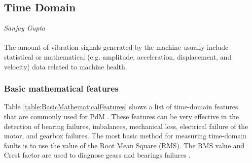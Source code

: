 \subsection{Time Domain}
\vspace*{-15mm}
\hfill{\normalsize\emph{Sanjay Gupta}}
\label{sec:feature-extraction:approaches:time-domain}
\\\\
The amount of vibration signals generated by the machine usually include statistical or mathematical (e.g. amplitude, acceleration, displacement, and velocity) data related to machine health.

\subsubsection*{Basic mathematical features}
Table \ref{table:BasicMathematicalFeatures} shows a list of time-domain features that are commonly used for PdM \cite{DBLP:phd/dnb/Kimotho16}. These features can be very effective in the detection of bearing failures, imbalances, mechanical loss, electrical failure of the motor, and gearbox failures. The most basic method for measuring time-domain faults is to use the value of the Root Mean Square (RMS). The RMS value and Crest factor are used to diagnose gears and bearings failures \cite{TANDON1999469}.
